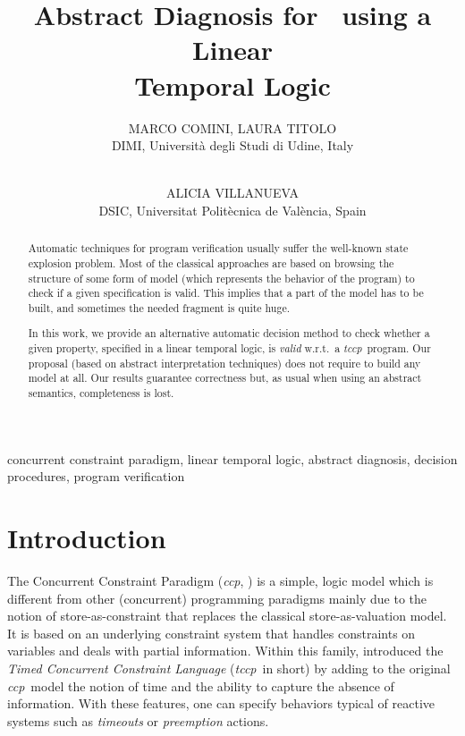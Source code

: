\documentclass[american]{new_tlp}
\title{Abstract Diagnosis for \tccp\ using a Linear\\ Temporal Logic}
\author[M. Comini, L. Titolo and A. Villanueva]
{MARCO COMINI, LAURA TITOLO\\
DIMI, Universit\`a degli Studi di Udine, Italy\\
\email{marco.comini@uniud.it}\\
\and ALICIA VILLANUEVA 
\\
DSIC, Universitat Polit\`ecnica de Val\`encia, Spain\\
\email{villanue@dsic.upv.es}}
\newcommand*{\ccp}{\textit{ccp}}
\newcommand*{\tccp}{\textit{tccp}}
\providecommand*{\wrt}  {w.r.t.}
\begin{document}
\pagestyle{plain}
\maketitle
\begin{abstract}
    Automatic techniques for program verification usually suffer the
    well-known state explosion problem.  Most of the classical approaches
    are based on browsing the structure of some form of model (which
    represents the behavior of the program) to check if a given
    specification is valid.  This implies that a part of the model has to
    be built, and sometimes the needed fragment is quite huge.
    
    In this work, we provide an alternative automatic decision method to
    check whether a given property, specified in a linear temporal logic,
    is \emph{valid} \wrt\ a \tccp\ program.  Our proposal (based on
    abstract interpretation techniques) does not require to build any model
    at all.
    Our results guarantee correctness but, as usual when using an abstract
    semantics, completeness is lost.
\end{abstract}



\begin{keywords}
    concurrent constraint paradigm, 
    linear temporal logic, 
    abstract diagnosis,
    decision procedures,
    program verification
\end{keywords}

\section{Introduction}




The Concurrent Constraint Paradigm (\ccp, \cite{Saraswat89phd}) is a
simple, logic model which is different from other (concurrent) programming
paradigms mainly due to the notion of store-as-constraint that replaces the
classical store-as-valuation model.  It is based on an underlying
constraint system that handles constraints on variables and deals with
partial information.  Within this family, \cite{deBoerGM99} introduced the
\emph{Timed Concurrent Constraint Language} (\tccp\ in short) by adding to
the original \ccp\ model the notion of time and the ability to capture the
absence of information.  With these features, one can specify behaviors
typical of reactive systems such as \emph{timeouts} or \emph{preemption}
actions.
\end{document}

